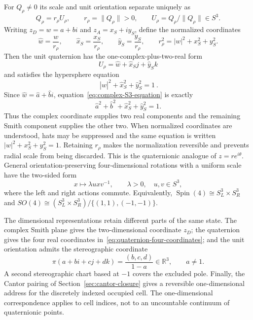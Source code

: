\documentclass[11pt]{amsart}
\theoremstyle{definition}
\theoremstyle{remark}
\begin{document}
For $Q_\rho\ne0$ its scale and unit orientation separate uniquely as
\begin{equation}\label{eq:quaternion-polar}
 Q_\rho=r_\rho U_\rho,
 \qquad r_\rho=\|Q_\rho\|>0,
 \qquad U_\rho=Q_\rho/\|Q_\rho\|\in S^3.
\end{equation}
Writing $z_D=w=a+bi$ and $z_A=x_S+iy_S$, define the normalized coordinates
\begin{equation}\label{eq:normalized-smith-quaternion-coordinates}
 \widehat w=\frac{w}{r_\rho},
 \qquad
 \widehat x_S=\frac{x_S}{r_\rho},
 \qquad
 \widehat y_S=\frac{y_S}{r_\rho},
 \qquad
 r_\rho^2=|w|^2+x_S^2+y_S^2.
\end{equation}
Then the unit quaternion has the one-complex-plus-two-real form
\begin{equation}\label{eq:one-complex-two-real-quaternion}
 U_\rho=\widehat w+\widehat x_Sj+\widehat y_Sk
\end{equation}
and satisfies the hypersphere equation
\begin{equation}\label{eq:complex-S3-equation}
 \boxed{\ |\widehat w|^2+\widehat x_S^2+\widehat y_S^2=1\ }.
\end{equation}
Since $\widehat w=\widehat a+\widehat b i$, equation~\eqref{eq:complex-S3-equation}
is exactly
\begin{equation}\label{eq:real-S3-equation}
 \widehat a^2+\widehat b^2+\widehat x_S^2+\widehat y_S^2=1.
\end{equation}
Thus the complex coordinate supplies two real components and the remaining Smith component
supplies the other two.  When normalized coordinates are understood, hats may be suppressed
and the same equation is written $|w|^2+x_S^2+y_S^2=1$.  Retaining $r_\rho$ makes the
normalization reversible and prevents radial scale from being discarded.
This is the quaternionic analogue of $z=re^{i\theta}$.  General orientation-preserving
four-dimensional rotations with a uniform scale have the two-sided form
\begin{equation}\label{eq:quaternion-two-sided-rotation}
 x\longmapsto \lambda u x v^{-1},
 \qquad \lambda>0,\quad u,v\in S^3,
\end{equation}
where the left and right actions commute.  Equivalently,
$\operatorname{Spin}(4)\cong S^3_L\times S^3_R$ and
$SO(4)\cong(S^3_L\times S^3_R)/\{(1,1),(-1,-1)\}$.

The dimensional representations retain different parts of the same state.  The complex
Smith plane gives the two-dimensional coordinate $z_D$; the quaternion gives the four real
coordinates in~\eqref{eq:quaternion-four-coordinates}; and the unit orientation admits the
stereographic coordinate
\begin{equation}\label{eq:S3-stereographic}
 \pi(a+bi+cj+dk)=\frac{(b,c,d)}{1-a}\in\mathbb R^3,
 \qquad a\ne1.
\end{equation}
A second stereographic chart based at $-1$ covers the excluded pole.  Finally, the Cantor
pairing of Section~\ref{sec:cantor-closure} gives a reversible one-dimensional address for
the discretely indexed occupied cell.  The one-dimensional correspondence applies to cell
indices, not to an uncountable continuum of quaternionic points.
\end{document}
